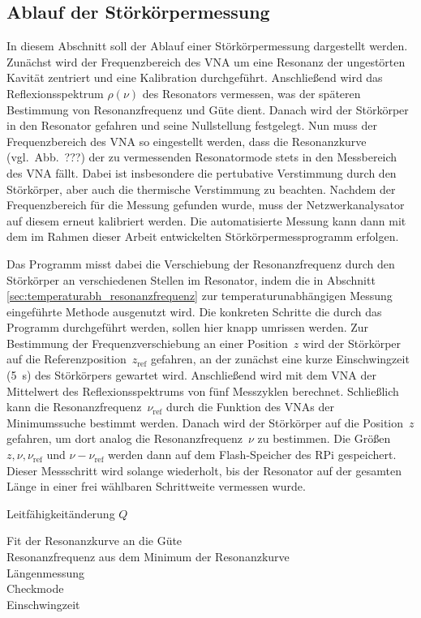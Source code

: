 \subsection{Ablauf der Störkörpermessung}
In diesem Abschnitt soll der Ablauf einer Störkörpermessung dargestellt werden.
Zunächst wird der Frequenzbereich des VNA um eine Resonanz der ungestörten Kavität zentriert und eine Kalibration durchgeführt.
Anschließend wird das Reflexionsspektrum $\rho(\nu)$ des Resonators vermessen, was der späteren Bestimmung von Resonanzfrequenz und Güte dient.
Danach wird der Störkörper in den Resonator gefahren und seine Nullstellung festgelegt.
Nun muss der Frequenzbereich des VNA so eingestellt werden, dass die Resonanzkurve (vgl.\ Abb.\ ???) der zu vermessenden Resonatormode stets in den Messbereich des VNA fällt.
Dabei ist insbesondere die pertubative Verstimmung durch den Störkörper, aber auch die thermische Verstimmung zu beachten.
Nachdem der Frequenzbereich für die Messung gefunden wurde, muss der Netzwerkanalysator auf diesem erneut kalibriert werden.
Die automatisierte Messung kann dann mit dem im Rahmen dieser Arbeit entwickelten Störkörpermessprogramm erfolgen.

Das Programm misst dabei die Verschiebung der Resonanzfrequenz durch den Störkörper an verschiedenen Stellen im Resonator, indem die in Abschnitt \ref{sec:temperaturabh_resonanzfrequenz} zur temperaturunabhängigen Messung eingeführte Methode ausgenutzt wird.
Die konkreten Schritte die durch das Programm durchgeführt werden, sollen hier knapp umrissen werden.
Zur Bestimmung der Frequenzverschiebung an einer Position~$z$ wird der Störkörper auf die Referenzposition~$z_\mathrm{ref}$ gefahren, an der zunächst eine kurze Einschwingzeit (\SI{5}{s}) des Störkörpers gewartet wird.
Anschließend wird mit dem VNA der Mittelwert des Reflexionsspektrums von fünf Messzyklen berechnet.
Schließlich kann die Resonanzfrequenz~$\nu_\mathrm{ref}$ durch die Funktion des VNAs der Minimumssuche bestimmt werden.
Danach wird der Störkörper auf die Position~$z$ gefahren, um dort analog die Resonanzfrequenz~$\nu$ zu bestimmen.
Die Größen $z, \nu, \nu_\mathrm{ref}$ und $\nu - \nu_\mathrm{ref}$ werden dann auf dem Flash-Speicher des RPi gespeichert.
Dieser Messschritt wird solange wiederholt, bis der Resonator auf der gesamten Länge in einer frei wählbaren Schrittweite vermessen wurde.


Leitfähigkeitänderung $Q$

Fit der Resonanzkurve an die Güte\\
Resonanzfrequenz aus dem Minimum der Resonanzkurve\\
Längenmessung\\
Checkmode\\
Einschwingzeit

